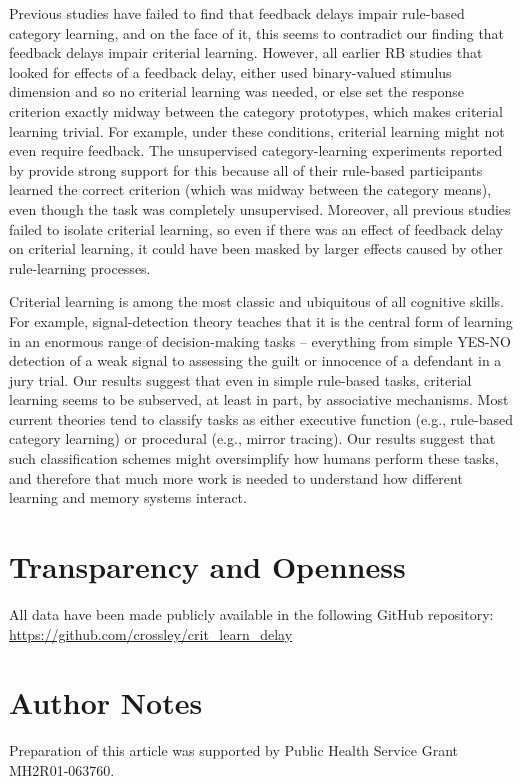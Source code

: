 \documentclass[doc, floatsintext]{apa7}
\begin{document}
Previous studies have failed to find that feedback delays
impair rule-based category learning, and on the face of it,
this seems to contradict our finding that feedback delays
impair criterial learning. However, all earlier RB studies
that looked for effects of a feedback delay, either used
binary-valued stimulus dimension and so no criterial
learning was needed, or else set the response criterion
exactly midway between the category prototypes, which makes
criterial learning trivial. For example, under these
conditions, criterial learning might not even require
feedback. The unsupervised category-learning experiments
reported by \textcite{ashby1999dominance} provide strong
support for this because all of their rule-based
participants learned the correct criterion (which was midway
between the category means), even though the task was
completely unsupervised. Moreover, all previous studies
failed to isolate criterial learning, so even if there was
an effect of feedback delay on criterial learning, it could
have been masked by larger effects caused by other
rule-learning processes.

Criterial learning is among the most classic and ubiquitous
of all cognitive skills. For example, signal-detection
theory teaches that it is the central form of learning in an
enormous range of decision-making tasks -- everything from
simple YES-NO detection of a weak signal to assessing the
guilt or innocence of a defendant in a jury trial. Our
results suggest that even in simple rule-based tasks,
criterial learning seems to be subserved, at least in part,
by associative mechanisms. Most current theories tend to
classify tasks as either executive function (e.g.,
rule-based category learning) or procedural (e.g., mirror
tracing). Our results suggest that such classification
schemes might oversimplify how humans perform these tasks,
and therefore that much more work is needed to understand
how different learning and memory systems interact.

\section{Transparency and Openness}
All data have been made publicly available in the following
GitHub repository:
\url{https://github.com/crossley/crit_learn_delay}

\section{Author Notes}
Preparation of this article was supported by Public Health
Service Grant MH2R01-063760.

\printbibliography
\end{document}
